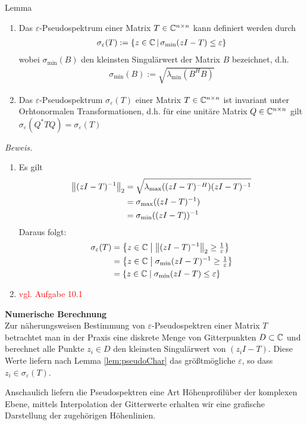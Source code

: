 \begin{colbox}{Lemma}\label{lem:pseudoChar}
  \begin{enumerate}
    \item 
      Das $\varepsilon$-Pseudospektrum einer Matrix $T\in\mathbb C  ^{n\times n}$ kann definiert werden 
      durch
      \begin{align*}
        \sigma_\varepsilon(T) 
        := \{z\in\mathbb C  \,|\,\sigma_{\min}(zI-T)\leq\varepsilon\}
      \end{align*}
      wobei $\sigma_{\min}(B)$ den kleinsten Singulärwert der Matrix $B$ bezeichnet, d.h. 
      \begin{align*}
        \sigma_{\min}(B) := \sqrt{\lambda_{\min}(B^HB)}
      \end{align*}
    \item 
      Das $\varepsilon$-Pseudospektrum $\sigma_\varepsilon(T)$ einer Matrix $T\in\mathbb C  ^{n\times n}$ ist 
      invariant unter Orhtonormalen Transformationen, d.h. für eine unitäre Matrix $Q\in\mathbb C  ^{n\times n}$ 
      gilt $\sigma_\varepsilon(Q^*TQ) = \sigma_\varepsilon(T)$
  \end{enumerate}
\end{colbox}

\textit{Beweis.} 
\begin{enumerate}
  \item 
    Es gilt
    \begin{align*}
      \vertn{2}{(zI-T)^{-1}}_2  
      &= \sqrt{\lambda_{\max}((zI-T)^{-H})(zI-T)^{-1}} \\
      &= \sigma_{\max}((zI-T)^{-1}) \\ 
      &= \sigma_{\min}((zI-T))^{-1} \\ 
    \end{align*}
    Daraus folgt:
    \begin{align*}
      \sigma_\varepsilon(T) 
      &= \left\{ z \in \C   \;\middle|\; \vertn{2}{(zI-T)^{-1}}_2 \geq \tfrac{1}{\varepsilon} \right\} \\
      &= \left\{ z \in \C   \;\middle|\; \sigma_{\min}(zI-T)^{-1} \geq \tfrac{1}{\varepsilon} \right\} \\
      &= \left\{ z \in \C   \;\middle|\; \sigma_{\min}(zI-T) \leq \varepsilon \right\}
    \end{align*}
  \item \textcolor{red}{vgl. Aufgabe 10.1}
\end{enumerate}

\textbf{Numerische Berechnung}\\
Zur näherungsweisen Bestimmung von $\varepsilon$-Pseudospektren einer Matrix $T$ betrachtet man in der Praxis eine 
diskrete Menge von Gitterpunkten $D\subset \mathbb C$ und berechnet alle Punkte $z_i\in D$ den kleinsten Singulärwert 
von $(z_i I - T)$. Diese Werte liefern nach Lemma \ref{lem:pseudoChar} das größtmögliche $\varepsilon$, so dass 
$z_i\in \sigma_{\varepsilon}(T)$. 

Anschaulich liefern die Pseudospektren eine Art Höhenprofilüber der komplexen Ebene, mittels Interpolation 
der Gitterwerte erhalten wir eine grafische Darstellung der zugehörigen Höhenlinien.

